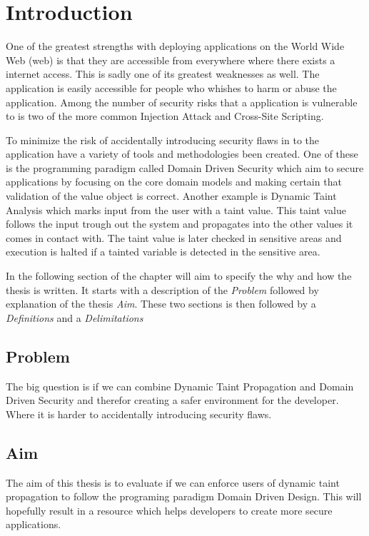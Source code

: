 \chapter{Introduction}
One of the greatest strengths with deploying applications on the World Wide Web (web) is that they are accessible from everywhere where there exists a internet access. This is sadly one of its greatest weaknesses as well. The application is easily accessible for people who whishes to harm or abuse the application. Among the number of security risks that a application is vulnerable to is two of the more common Injection Attack and Cross-Site Scripting. \parencite{OpenWebApplicationSecurityProject, CrossMichael2007Dgtw}

To minimize the risk of accidentally introducing security flaws in to the application have a variety of tools and methodologies been created. One of these is the programming paradigm called Domain Driven Security which aim to secure applications by focusing on the core domain models and making certain that validation of the value object is correct. Another example is Dynamic Taint Analysis which marks input from the user with a taint value. This taint value follows the input trough out the system and propagates into the other values it comes in contact with. The taint value is later checked in sensitive areas and execution is halted if a tainted variable is detected in the sensitive area. 

In the following section of the chapter will aim to specify the why and how the thesis is written. It starts with a description of the \textit{Problem} followed by explanation of the thesis \textit{Aim}. These two sections is then followed by a \textit{Definitions} and a \textit{Delimitations}



\section{Problem}
The big question is if we can combine Dynamic Taint Propagation and Domain Driven Security and therefor creating a safer environment for the developer. Where it is harder to accidentally introducing security flaws. 


\section{Aim}
The aim of this thesis is to evaluate if we can enforce users of dynamic taint propagation to follow the programing paradigm Domain Driven Design. This will hopefully result in a resource which helps developers to create more secure applications.


